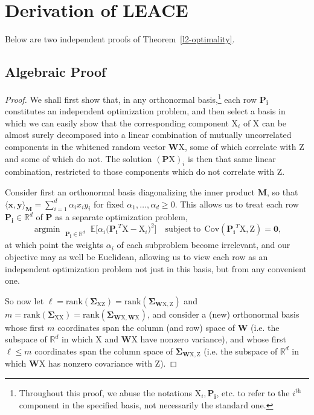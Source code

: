 \documentclass{article}
\theoremstyle{plain}
\theoremstyle{remark}
\newcommand{\sxx}{\mathbf \Sigma_{\rv X \rv X}}
\newcommand{\sxz}{\mathbf \Sigma_{\rv X \rv Z}}
\newcommand{\swxz}{\mathbf \Sigma_{\mathbf{W} \rv X, \rv Z}}
\newcommand{\swxwx}{\mathbf \Sigma_{\mathbf{W} \rv X, \mathbf{W} \rv X}}
\newcommand{\E}{\mathbb E}
\theoremstyle{plain}
\theoremstyle{TheoremNum}
\newcommand{\rank}{\mathrm{rank}}
\newcommand{\rv}[1]{{\mathrm{#1}}}
\begin{document}
\section{Derivation of LEACE}
\thmltwooptimality*

Below are two independent proofs of Theorem~\ref{l2-optimality}.

\subsection{Algebraic Proof}\label{oct-10-proof}

\begin{proof}
    We shall first show that, in any orthonormal basis,\footnote{Throughout this proof, we abuse the notations $\rv X_i, \mathbf{P_i}$, etc. to refer to the $i^\text{th}$ component in the specified basis, not necessarily the standard one.} each row $\mathbf{P_i}$ constitutes an independent optimization problem, and then select a basis in which we can easily show that the corresponding component $\rv X_i$ of $\rv X$ can be almost surely decomposed into a linear combination of mutually uncorrelated components in the whitened random vector $\mathbf W \rv X$, some of which correlate with $\rv Z$ and some of which do not. The solution $(\mathbf P \rv X)_i$ is then that same linear combination, restricted to those components which do not correlate with $\rv Z$.

    Consider first an orthonormal basis diagonalizing the inner product $\mathbf{M}$, so that $\langle \mathbf{x}, \mathbf{y} \rangle_\mathbf{M} = \sum_{i=1}^d \alpha_{i}x_iy_i$ for fixed $\alpha_1, \ldots, \alpha_d \ge 0$. This allows us to treat each row $\mathbf{P_i} \in \mathbb R^d$ of $\mathbf{P}$ as a separate optimization problem,
    \begin{equation*}
    \mathop{\mathrm{argmin\:}}_{\substack{\mathbf{P_i} \in \mathbb{R}^d}} \E \Big [ \alpha_i \big( \mathbf{P_i}^T\rv X - \rv X_i \big)^2 \Big ]\quad \mathrm{subject\:to}\:\: \mathrm{Cov}(\mathbf{P_i}^T\rv X, \rv Z) = \mathbf{0},
    \end{equation*}
    at which point the weights $\alpha_i$ of each subproblem become irrelevant, and our objective may as well be Euclidean, allowing us to view each row as an independent optimization problem not just in this basis, but from any convenient one.

    So now let $\ell = \rank(\sxz) = \rank(\swxz)$ and $m = \rank(\sxx) = \rank(\swxwx)$, and consider a (new) orthonormal basis whose first $m$ coordinates span the column (and row) space of $\mathbf W$ (i.e. the subspace of $\mathbb R^d$ in which $\rv X$ and $\mathbf{W} \rv X$ have nonzero variance), and whose first $\ell \le m$ coordinates span the column space of $\swxz$ (i.e. the subspace of $\mathbb R^d$ in which $\mathbf{W} \rv X$ has nonzero covariance with $\rv Z$).


\end{proof}
\end{document}
